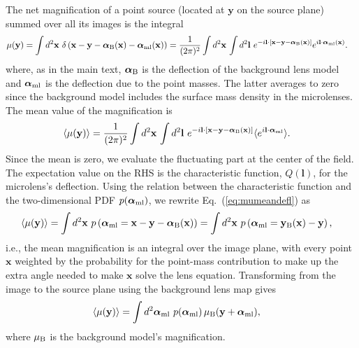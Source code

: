 \documentclass{aastex6}
\newcommand{\bt}[1]{\mathbf #1}
\newcommand{\refeq}[1]{Eq.~(\ref{eq:#1})}
\begin{document}
The net magnification of a point source (located at $\bt y$ on the source plane) 
summed over all its images is the integral
\begin{align}
  \mu(\bt y) & = \int d^2{\bt x} \,\, \delta\left(\bt x - \bt y - \bm{\alpha}_{\rm B}(\bt x) - \bm{\alpha}_{\rm ml}(\bt x) \right) 
  = \frac{1}{(2\pi)^2} \int d^2{\bt x} \, \int d^2{\bt l}\, \, e^{- i {\bt l} \cdot \left[ \bt x - \bt y - \bm{\alpha}_{\rm B}(\bt x) \right]} e^{ i {\bt l} \cdot \bm{\alpha}_{\rm ml}(\bt x) } \mbox{.} \label{eq:mudefpt}
\end{align}
where, as in the main text, $\bm\alpha_{\rm B}$ is the deflection of the background 
lens model and $\bm\alpha_{\rm ml}$ is the deflection due to the point masses. The
latter averages to zero since the background model includes the surface mass density
in the microlenses. The mean value of the magnification is
\begin{align}
\label{eq:mumeandefl}
  \langle \mu(\bt y) \rangle & = \frac{1}{(2\pi)^2} \int d^2{\bt x} \, \int d^2{\bt l} \,\, e^{- i {\bt l} \cdot \left[ \bt x - \bt y - \bm{\alpha}_{\rm B}(\bt x) \right]} \langle e^{ i {\bt l} \cdot \bm{\alpha}_{\rm ml} } \rangle \mbox{.} 
\end{align}
Since the mean is zero, we evaluate the fluctuating part at the center of the field. 
The expectation value on the RHS is the characteristic function, $Q(\bt l)$, for the 
microlens's deflection. Using the relation between the characteristic function and the 
two-dimensional PDF $p(\bm{\alpha}_{\rm ml})$, we rewrite 
\refeq{mumeandefl} as
\begin{align}
  \langle \mu(\bt y) \rangle & = \int d^2{\bt x}\, \, p\left( \bm{\alpha}_{\rm ml} = \bt x - \bt y - \bm{\alpha}_{\rm B}(\bt x) \right) = \int d^2{\bt x}\, \, p\left( \bm{\alpha}_{\rm ml} = {\bt y}_{\rm B}(\bt x) - \bt y \right) \mbox{,} \label{eq:meanmudef}
\end{align}
i.e., the mean magnification is an integral over the image plane, with every point $\bt x$
weighted by the probability for the point-mass contribution to make up the extra angle 
needed to make $\bt x$ solve the lens equation. Transforming from the image to the 
source plane using the background lens map gives
\begin{align}
\label{eq:meanmugen}
  \langle \mu  (\bt y) \rangle & = \int d^2\bm{\alpha}_{\rm ml}\, \,p(\bm{\alpha}_{\rm ml})\, \mu_{\rm B}(\bt y + \bm{\alpha}_{\rm ml}),
\end{align}
where $\mu_{\rm B}$ is the background model's magnification.
\end{document}
